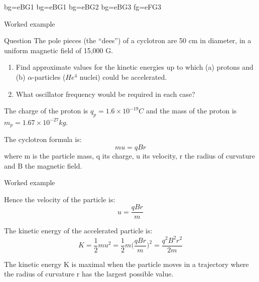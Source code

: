 {
 {bg=eBG1}
 {bg=eBG1}
 {bg=eBG2}
 {bg=eBG3}
 {fg=eFG3}

%
%
%

\begin{frame}{Worked example}

\begin{blockexmplque}{Question}
The pole pieces (the ``dees'') of a cyclotron are 50 cm in diameter, in a uniform magnetic field of 15,000 G.
\begin{enumerate}
  \item Find approximate values for the kinetic energies up to which
            (a) protons and (b) $\alpha$-particles ($He^{4}$ nuclei) could be accelerated.
  \item What oscillator frequency would be required in each case?
\end{enumerate}
The charge of the proton is $q_p = 1.6 \times 10^{-19} C$ and the mass of the proton is $m_p = 1.67 \times 10^{-27} kg$.
\end{blockexmplque}
\vspace{0.4cm}

The cyclotron formula is:
\begin{equation*}
  m u = q B r
\end{equation*}
where m is the particle mass, q its charge, u its velocity, r the radius of curvature and B the magnetic field.

\end{frame}

%
%
%

\begin{frame}{Worked example}

Hence the velocity of the particle is:
\begin{equation*}
  u = \frac{q B r}{m}
\end{equation*}

The kinetic energy of the accelerated particle is:
\begin{equation*}
  K = \frac{1}{2} m u^2 = \frac{1}{2} m \Big( \frac{q B r}{m} \Big)^2 =  \frac{q^2 B^2 r^2}{2m}
\end{equation*}

The kinetic energy K is maximal when the particle moves in a trajectory where the radius of curvature r
has the largest possible value. \\
\vspace{0.2cm}


\end{frame}}
